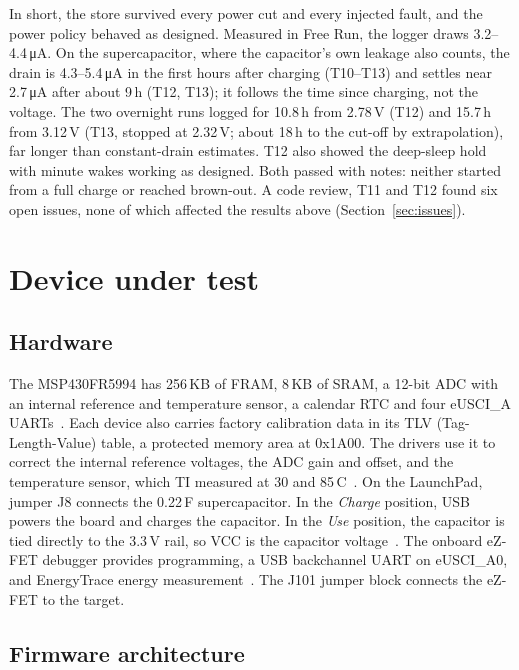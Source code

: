 \documentclass[11pt,a4paper]{article}
\newcommand{\uA}{\,\si{\micro\ampere}}
\begin{document}
In short, the store survived every power cut and every injected fault, and the power policy behaved as designed. Measured in Free Run, the logger draws 3.2--4.4\uA. On the supercapacitor, where the capacitor's own leakage also counts, the drain is 4.3--5.4\uA{} in the first hours after charging (T10--T13) and settles near 2.7\uA{} after about 9\,h (T12, T13); it follows the time since charging, not the voltage. The two overnight runs logged for 10.8\,h from 2.78\,V (T12) and 15.7\,h from 3.12\,V (T13, stopped at 2.32\,V; about 18\,h to the cut-off by extrapolation), far longer than constant-drain estimates. T12 also showed the deep-sleep hold with minute wakes working as designed. Both passed with notes: neither started from a full charge or reached brown-out. A code review, T11 and T12 found six open issues, none of which affected the results above (Section~\ref{sec:issues}).

\section{Device under test}
\label{sec:dut}

\subsection{Hardware}

The MSP430FR5994 has 256\,KB of FRAM, 8\,KB of SRAM, a 12-bit ADC with an internal reference and temperature sensor, a calendar RTC and four eUSCI\_A UARTs~\cite{ti_slase54}. Each device also carries factory calibration data in its TLV (Tag-Length-Value) table, a protected memory area at 0x1A00. The drivers use it to correct the internal reference voltages, the ADC gain and offset, and the temperature sensor, which TI measured at 30 and 85\,\textdegree C~\cite{ti_slau367}. On the LaunchPad, jumper J8 connects the 0.22\,F supercapacitor. In the \emph{Charge} position, USB powers the board and charges the capacitor. In the \emph{Use} position, the capacitor is tied directly to the 3.3\,V rail, so VCC is the capacitor voltage~\cite{ti_slau678}. The onboard eZ-FET debugger provides programming, a USB backchannel UART on eUSCI\_A0, and EnergyTrace energy measurement~\cite{ti_slaa603}. The J101 jumper block connects the eZ-FET to the target.

\subsection{Firmware architecture}
\end{document}
